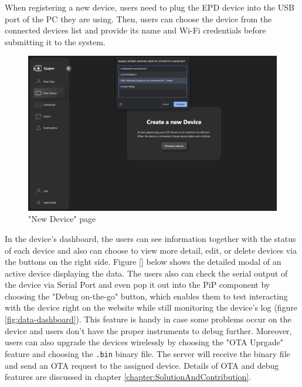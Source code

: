 \documentclass[../Main.tex]{subfiles}
\begin{document}
When registering a new device, users need to plug the \gls{EPD} device into the USB port of the PC they are using. Then, users can choose the device from the connected devices list and provide its name and Wi-Fi credentials before submitting it to the system.

\begin{figure}[H]
    \centering
    \includegraphics[width=0.87\linewidth]{doc//imgs/ui_new-device.png}
    \caption{"New Device" page}
    \label{fig:ui_new-device}
\end{figure}

In the device's dashboard, the users can see information together with the status of each device and also can choose to view more detail, edit, or delete devices via the buttons on the right side. Figure \ref{} below shows the detailed modal of an active device displaying the data. The users also can check the serial output of the device via Serial Port and even pop it out into the PiP component by choosing the "Debug on-the-go" button, which enables them to test interacting with the device right on the website while still monitoring the device's log (figure \ref{fig:data-dashboard}). This feature is handy in case some problems occur on the device and users don't have the proper instruments to debug further. Moreover, users can also upgrade the devices wirelessly by choosing the "OTA Uprgade" feature and choosing the \verb|.bin| binary file. The server will receive the binary file and send an OTA request to the assigned device. Details of OTA and debug features are discussed in chapter \ref{chapter:SolutionAndContribution}.
\end{document}
